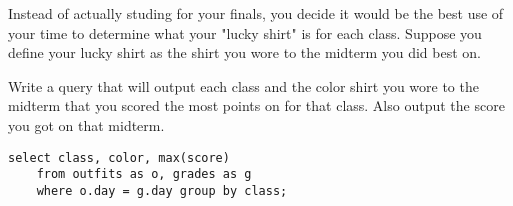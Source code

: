 \begin{blocksection}
\question 
Instead of actually studing for your finals, you decide it would be the best use of your time to determine what your "lucky shirt" is for each class. Suppose you define your lucky shirt as the shirt you wore to the midterm you did best on.

Write a query that will output each class and the color shirt you wore to the midterm that you scored the most points on for that class. Also output the score you got on that midterm.

\begin{solution}[1.5in]
\begin{lstlisting}
select class, color, max(score)
    from outfits as o, grades as g
    where o.day = g.day group by class;
\end{lstlisting}
\end{solution}
\end{blocksection}